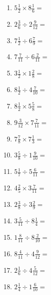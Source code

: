 \documentclass[12pt]{article}
\begin{document}
\begin{enumerate}
\item \large $ 5 \frac{1}{2} \times 8 \frac{1}{6} = $ \vspace{1.6cm}
\item \large $ 2 \frac{3}{6} \div 2 \frac{9}{12} = $ \vspace{1.6cm}
\item \large $ 7 \frac{1}{2} \div 6 \frac{7}{9} = $ \vspace{1.6cm}
\item \large $ 7 \frac{7}{11} \div 6 \frac{2}{11} = $ \vspace{1.6cm}
\newpage
\item \large $ 3 \frac{1}{2} \times 1 \frac{2}{8} = $ \vspace{1.6cm}
\item \large $ 8 \frac{1}{2} \div 4 \frac{7}{10} = $ \vspace{1.6cm}
\item \large $ 8 \frac{1}{2} \times 5 \frac{5}{8} = $ \vspace{1.6cm}
\item \large $ 9 \frac{3}{12} \times 7 \frac{7}{11} = $ \vspace{1.6cm}
\item \large $ 7 \frac{7}{8} \times 7 \frac{1}{3} = $ \vspace{1.6cm}
\item \large $ 3 \frac{5}{8} \div 1 \frac{9}{10} = $ \vspace{1.6cm}
\item \large $ 5 \frac{1}{7} \div 5 \frac{6}{11} = $ \vspace{1.6cm}
\item \large $ 4 \frac{2}{5} \times 3 \frac{7}{11} = $ \vspace{1.6cm}
\item \large $ 2 \frac{3}{8} \div 3 \frac{2}{9} = $ \vspace{1.6cm}
\item \large $ 3 \frac{5}{11} \div 8 \frac{1}{4} = $ \vspace{1.6cm}
\newpage
\item \large $ 1 \frac{8}{11} \div 8 \frac{2}{10} = $ \vspace{1.6cm}
\item \large $ 8 \frac{4}{11} \div 4 \frac{9}{12} = $ \vspace{1.6cm}
\item \large $ 2 \frac{1}{6} \div 4 \frac{5}{12} = $ \vspace{1.6cm}
\item \large $ 2 \frac{1}{4} \div 1 \frac{6}{10} = $ \vspace{1.6cm}

\end{enumerate}
\end{document}
